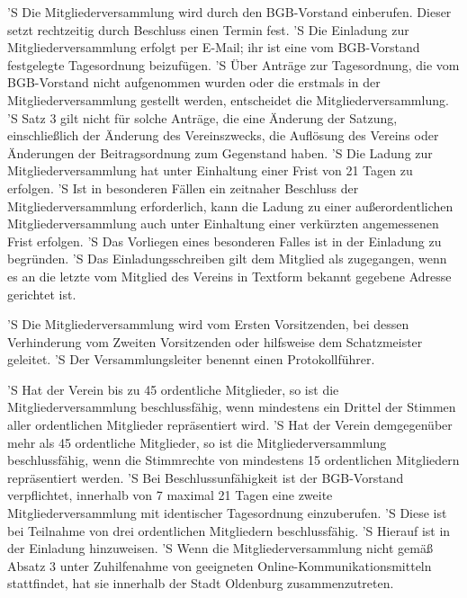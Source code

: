 \documentclass[a4paper,10pt]{scrreprt}
\begin{document}
\begin{contract}
'S Die Mitgliederversammlung wird durch den BGB-Vorstand einberufen. Dieser setzt
rechtzeitig durch Beschluss einen Termin fest.
'S Die Einladung zur Mitgliederversammlung erfolgt per E-Mail; ihr ist eine vom
BGB-Vorstand festgelegte Tagesordnung beizufügen.
'S Über Anträge zur Tagesordnung, die vom BGB-Vorstand nicht aufgenommen wurden
oder die erstmals in der Mitgliederversammlung gestellt werden, entscheidet die
Mitgliederversammlung.
'S Satz 3 gilt nicht für solche Anträge, die eine Änderung der Satzung,
einschließlich der Änderung des Vereinszwecks, die Auflösung des Vereins oder
Änderungen der Beitragsordnung zum Gegenstand haben.
'S Die Ladung zur Mitgliederversammlung hat unter Einhaltung einer Frist von 21
Tagen zu erfolgen.
'S Ist in besonderen Fällen ein zeitnaher Beschluss der Mitgliederversammlung
erforderlich, kann die Ladung zu einer außerordentlichen Mitgliederversammlung
auch unter Einhaltung einer verkürzten angemessenen Frist erfolgen.
'S Das Vorliegen eines besonderen Falles ist in der Einladung zu begründen.
'S Das Einladungsschreiben gilt dem Mitglied als zugegangen, wenn es an die
letzte vom Mitglied des Vereins in Textform bekannt gegebene Adresse gerichtet
ist.

'S Die Mitgliederversammlung wird vom Ersten Vorsitzenden, bei dessen
Verhinderung vom Zweiten Vorsitzenden oder hilfsweise dem Schatzmeister
geleitet.
'S Der Versammlungsleiter benennt einen Protokollführer.

'S Hat der Verein bis zu 45 ordentliche Mitglieder, so ist die
Mitgliederversammlung beschlussfähig, wenn mindestens ein Drittel der Stimmen
aller ordentlichen Mitglieder repräsentiert wird.
'S Hat der Verein demgegenüber mehr als 45 ordentliche Mitglieder, so ist die
Mitgliederversammlung beschlussfähig, wenn die Stimmrechte von mindestens 15
ordentlichen Mitgliedern repräsentiert werden.
'S Bei Beschlussunfähigkeit ist der BGB-Vorstand verpflichtet, innerhalb von 7
maximal 21 Tagen eine zweite Mitgliederversammlung mit identischer Tagesordnung
einzuberufen.
'S Diese ist bei Teilnahme von drei ordentlichen Mitgliedern beschlussfähig.
'S Hierauf ist in der Einladung hinzuweisen.
'S Wenn die Mitgliederversammlung nicht gemäß Absatz 3 unter Zuhilfenahme von
geeigneten Online-Kommunikationsmitteln stattfindet, hat sie innerhalb der
Stadt Oldenburg zusammenzutreten.


\end{contract}
\end{document}
